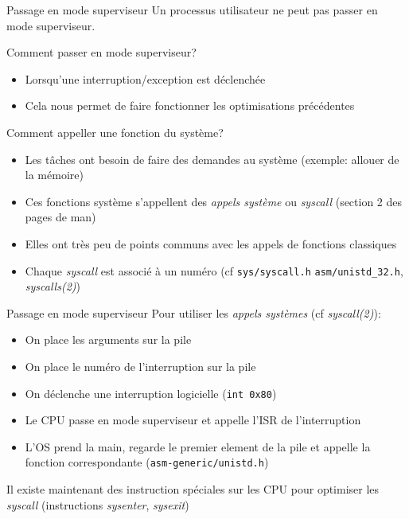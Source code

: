 \begin{frame}{Passage en mode superviseur}
  Un processus utilisateur ne peut pas passer en mode superviseur.

  Comment passer en mode superviseur?
  \begin{itemize} 
  \item Lorsqu'une interruption/exception est déclenchée
  \item Cela nous permet de faire fonctionner les optimisations précédentes
  \end{itemize} 

  Comment appeller une fonction du système?
  \begin{itemize} 
  \item  Les  tâches ont  besoin  de  faire  des demandes  au  système
    (exemple: allouer de la mémoire)
  \item Ces fonctions système s'appellent des \emph{appels système} ou
    \emph{syscall} (section 2 des pages de man)
  \item  Elles ont  très  peu de  points  communs avec  les appels  de
    fonctions classiques
  \item   Chaque  \emph{syscall}   est   associé  à   un  numéro   (cf
    \texttt{sys/syscall.h}                   \texttt{asm/unistd\_32.h},
    \emph{syscalls(2)})
  \end{itemize}

\end{frame}

\begin{frame}{Passage en mode superviseur}
  Pour utiliser les \emph{appels systèmes} (cf \emph{syscall(2)}):
  \begin{itemize}
  \item On place les arguments sur la pile
  \item On place le numéro de l'interruption sur la pile
  \item On déclenche une interruption logicielle (\texttt{int 0x80})
  \item  Le  CPU  passe  en  mode  superviseur  et  appelle  l'ISR  de
    l'interruption
  \item L'OS prend  la main, regarde le premier element  de la pile et
    appelle la fonction correspondante (\texttt{asm-generic/unistd.h})
  \end{itemize}
  Il  existe maintenant  des instruction  spéciales sur  les  CPU pour
  optimiser   les    \emph{syscall}   (instructions   \emph{sysenter},
  \emph{sysexit})
\end{frame}

